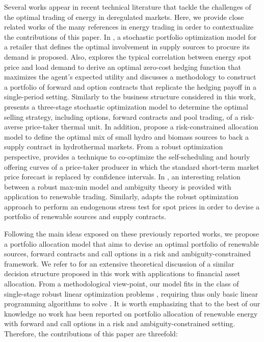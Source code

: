 	Several works appear in recent technical literature that tackle the challenges of the optimal trading of energy in deregulated markets. Here, we provide close related works of the many references in energy trading in order to contextualize the contributions of this paper. In \cite{AStochDMFram_ElectrRetailer}, a stochastic portfolio optimization model for a retailer that defines the optimal involvement in supply sources to procure its demand is proposed. Also, \cite{HedgingQtdRisk_Oren} explores the typical correlation between energy spot price and load demand to derive an optimal zero-cost hedging function that maximizes the agent's expected utility and discusses a methodology to construct a portfolio of forward and option contracts that replicate the hedging payoff in a single-period setting. Similarly to the business structure considered in this work, \cite{ManagFinRiskWithCall} presents a three-stage stochastic optimization model to determine the optimal selling strategy, including options, forward contracts and pool trading, of a risk-averse price-taker thermal unit. In addition, \cite{RiskConstPortSelect} propose a risk-constrained allocation model to define the optimal mix of small hydro and biomass sources to back a supply contract in hydrothermal markets. From a robust optimization perspective, \cite{OfferingStrat_RO} provides a technique to co-optimize the self-scheduling and hourly offering curves of a price-taker producer in which the standard short-term market price forecast is replaced by confidence intervals. In \cite{AmbiguityEnergySpotPrice}, an interesting relation between a robust max-min model and ambiguity theory is provided with application to renewable trading. Similarly, \cite{RobustSpotPrice} adapts the robust optimization approach to perform an endogenous stress test for spot prices in order to devise a portfolio of renewable sources and supply contracts.

	Following the main ideas exposed on these previously reported works, we propose a portfolio allocation model that aims to devise an optimal portfolio of renewable sources, forward contracts and call options in a risk and ambiguity-constrained framework. We refer to \cite{SoftRobustModel_UnderAmb} for an extensive theoretical discussion of a similar decision structure proposed in this work with applications to financial asset allocation. From a methodological view-point, our model fits in the class of single-stage robust linear optimization problems \cite{PriceOfRobustness}, requiring thus only basic linear programming algorithms to solve \cite{Xpress}. It is worth emphasizing that to the best of our knowledge no work has been reported on portfolio allocation of renewable energy with forward and call options in a risk and ambiguity-constrained setting. Therefore, the contributions of this paper are threefold:

